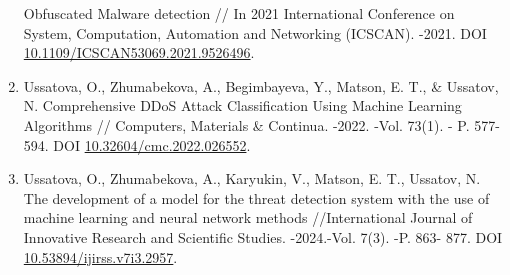\begin{references}
\begin{enumerate}
  Obfuscated Malware detection // In 2021 International Conference on
  System, Computation, Automation and Networking (ICSCAN). -2021. DOI
  \href{https://doi.org/10.1109/ICSCAN53069.2021.9526496}{10.1109/ICSCAN53069.2021.9526496}.
\item
  Ussatova, O., Zhumabekova, A., Begimbayeva, Y., Matson, E. T., \&
  Ussatov, N. Comprehensive DDoS Attack Classification Using Machine
  Learning Algorithms // Computers, Materials \& Continua. -2022. -Vol.
  73(1). - P. 577-594. DOI
  \href{https://doi.org/10.32604/cmc.2022.026552}{10.32604/cmc.2022.026552}.
\item
  Ussatova, O., Zhumabekova, A., Karyukin, V., Matson, E. T., Ussatov,
  N. The development of a model for the threat detection system with the
  use of machine learning and neural network methods //International
  Journal of Innovative Research and Scientific Studies. -2024.-Vol.
  7(3). -P. 863- 877. DOI
  \\\href{https://doi.org/10.53894/ijirss.v7i3.2957}{10.53894/ijirss.v7i3.2957}.
\end{enumerate}
\end{references}

